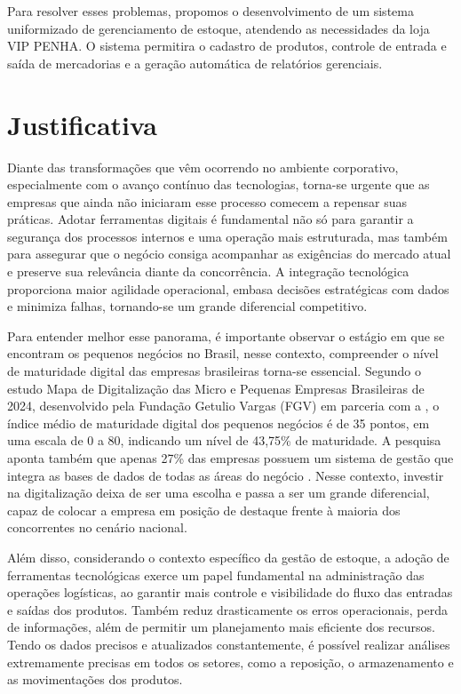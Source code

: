 \documentclass[
	12pt,				%
	openany,			%
	twoside,			%
	a4paper,			%
	english,			%
	brazil				%
	]{abntex2}
\begin{document}
Para resolver esses problemas, propomos o desenvolvimento de um sistema uniformizado de gerenciamento de estoque, atendendo as necessidades da loja VIP PENHA. O sistema permitira o cadastro de produtos, controle de entrada e saída de mercadorias e a geração automática de relatórios gerenciais.  

\section{Justificativa}
Diante das transformações que vêm ocorrendo no ambiente corporativo, especialmente com o avanço contínuo das tecnologias, torna-se urgente que as empresas que ainda não iniciaram esse processo comecem a repensar suas práticas. Adotar ferramentas digitais é fundamental não só para garantir a segurança dos processos internos e uma operação mais estruturada, mas também para assegurar que o negócio consiga acompanhar as exigências do mercado atual e preserve sua relevância diante da concorrência. A integração tecnológica proporciona maior agilidade operacional, embasa decisões estratégicas com dados e minimiza falhas, tornando-se um grande diferencial competitivo.

Para entender melhor esse panorama, é importante observar o estágio em que se encontram os pequenos negócios no Brasil, nesse contexto, compreender o nível de maturidade digital das empresas brasileiras torna-se essencial. Segundo o estudo Mapa de Digitalização das Micro e Pequenas Empresas Brasileiras de 2024, desenvolvido pela Fundação Getulio Vargas (FGV) em parceria com a  , o índice médio de maturidade digital dos pequenos negócios é de 35 pontos, em uma escala de 0 a 80, indicando um nível de 43,75\% de maturidade. A pesquisa aponta também que apenas 27\% das empresas possuem um sistema de gestão que integra as bases de dados de todas as áreas do negócio . Nesse contexto, investir na digitalização deixa de ser uma escolha e passa a ser um grande diferencial, capaz de colocar a empresa em posição de destaque frente à maioria dos concorrentes no cenário nacional.


Além disso, considerando o contexto específico da gestão de estoque, a adoção de ferramentas tecnológicas exerce um papel fundamental na administração das operações logísticas, ao garantir mais controle e visibilidade do fluxo das entradas e saídas dos produtos. Também reduz drasticamente os erros operacionais, perda de informações, além de permitir um planejamento mais eficiente dos recursos. Tendo os dados precisos e atualizados constantemente, é possível realizar análises extremamente precisas em todos os setores, como a reposição, o armazenamento e as movimentações dos produtos.
\end{document}
